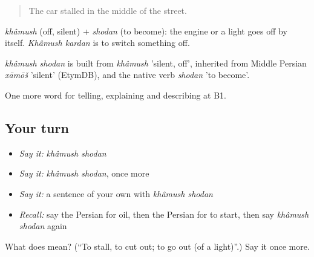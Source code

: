 \begin{quote}
The car stalled in the middle of the street.
\end{quote}

\emph{khâmush} (off, silent) + \emph{shodan} (to become): the engine or a light goes off by itself. \emph{Khâmush kardan} is to switch something off.

\begin{cousinweb}
\emph{khâmush shodan} is built from \emph{khâmush} 'silent, off', inherited from Middle Persian \emph{xāmōš} 'silent' (EtymDB), and the native verb \emph{shodan} 'to become'.
\end{cousinweb}

\begin{grammarlens}[title={What you've built}]
One more word for telling, explaining and describing at B1.
\end{grammarlens}

\subsection*{Your turn}
\begin{itemize}
\raggedright
  \item \emph{Say it:} \emph{khâmush shodan}
  \item \emph{Say it:} \emph{khâmush shodan}, once more
  \item \emph{Say it:} a sentence of your own with \emph{khâmush shodan}
  \item \emph{Recall:} say the Persian for oil, then the Persian for to start, then say \emph{khâmush shodan} again
\end{itemize}

\begin{tcolorbox}[breakable,colback=teal!4,colframe=teal!35!black,title={Before you move on}]
What does   mean? (\textquotedblleft{}To stall, to cut out; to go out (of a light)\textquotedblright{}.) Say it once more.
\end{tcolorbox}
